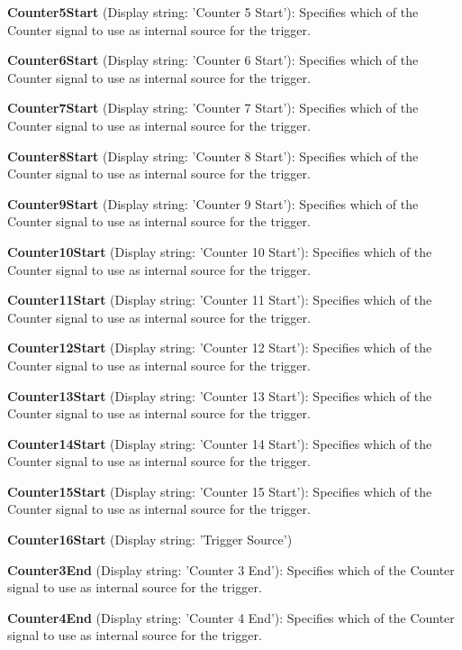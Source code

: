 \begin{DoxyItemize}
\item {\bfseries Counter5\+Start} (Display string\+: 'Counter 5 Start')\+: Specifies which of the Counter signal to use as internal source for the trigger.
\item {\bfseries Counter6\+Start} (Display string\+: 'Counter 6 Start')\+: Specifies which of the Counter signal to use as internal source for the trigger.
\item {\bfseries Counter7\+Start} (Display string\+: 'Counter 7 Start')\+: Specifies which of the Counter signal to use as internal source for the trigger.
\item {\bfseries Counter8\+Start} (Display string\+: 'Counter 8 Start')\+: Specifies which of the Counter signal to use as internal source for the trigger.
\item {\bfseries Counter9\+Start} (Display string\+: 'Counter 9 Start')\+: Specifies which of the Counter signal to use as internal source for the trigger.
\item {\bfseries Counter10\+Start} (Display string\+: 'Counter 10 Start')\+: Specifies which of the Counter signal to use as internal source for the trigger.
\item {\bfseries Counter11\+Start} (Display string\+: 'Counter 11 Start')\+: Specifies which of the Counter signal to use as internal source for the trigger.
\item {\bfseries Counter12\+Start} (Display string\+: 'Counter 12 Start')\+: Specifies which of the Counter signal to use as internal source for the trigger.
\item {\bfseries Counter13\+Start} (Display string\+: 'Counter 13 Start')\+: Specifies which of the Counter signal to use as internal source for the trigger.
\item {\bfseries Counter14\+Start} (Display string\+: 'Counter 14 Start')\+: Specifies which of the Counter signal to use as internal source for the trigger.
\item {\bfseries Counter15\+Start} (Display string\+: 'Counter 15 Start')\+: Specifies which of the Counter signal to use as internal source for the trigger.
\item {\bfseries Counter16\+Start} (Display string\+: 'Trigger Source')
\item {\bfseries Counter3\+End} (Display string\+: 'Counter 3 End')\+: Specifies which of the Counter signal to use as internal source for the trigger.
\item {\bfseries Counter4\+End} (Display string\+: 'Counter 4 End')\+: Specifies which of the Counter signal to use as internal source for the trigger.

\end{DoxyItemize}
